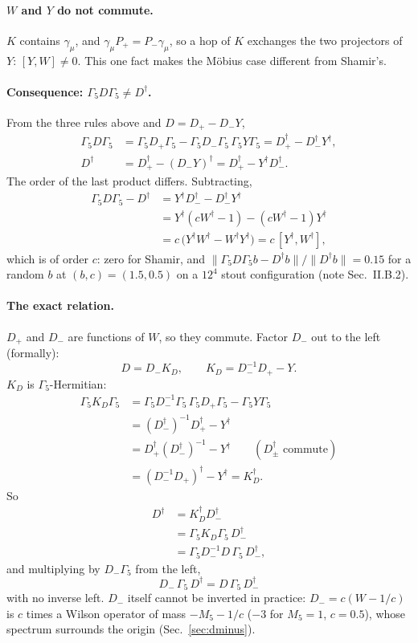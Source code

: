 \documentclass[11pt,a4paper]{article}
\numberwithin{equation}{section}
\newcommand{\dg}{^{\dagger}}
\newcommand{\Pp}{P_{+}}
\newcommand{\Pm}{P_{-}}
\newcommand{\Gfive}{\Gamma_5}
\begin{document}
\paragraph{$W$ and $Y$ do not commute.} $K$ contains $\gamma_\mu$, and
$\gamma_\mu\Pp=\Pm\gamma_\mu$, so a hop of $K$ exchanges the two projectors of $Y$: $[Y,W]\neq0$.
This one fact makes the M\"obius case different from Shamir's.

\paragraph{Consequence: $\Gfive D\Gfive\neq D\dg$.}
From the three rules above and $D=D_+-D_-Y$,
\begin{align}
\Gfive D\Gfive&=\Gfive D_+\Gfive-\Gfive D_-\Gfive\,\Gfive Y\Gfive=D_+\dg-D_-\dg Y\dg,\nonumber\\
D\dg&=D_+\dg-(D_-Y)\dg=D_+\dg-Y\dg D_-\dg .
\end{align}
The order of the last product differs. Subtracting,
\begin{align}
\Gfive D\Gfive-D\dg&=Y\dg D_-\dg-D_-\dg Y\dg\nonumber\\
&=Y\dg(cW\dg-1)-(cW\dg-1)Y\dg\nonumber\\
&=c\,\big(Y\dg W\dg-W\dg Y\dg\big)=c\,[Y\dg,W\dg],
\end{align}
which is of order $c$: zero for Shamir, and $\|\Gfive D\Gfive b-D\dg b\|/\|D\dg b\|=0.15$ for a
random $b$ at $(b,c)=(1.5,0.5)$ on a $12^4$ stout configuration (note Sec.~II.B.2).


\paragraph{The exact relation.}
$D_+$ and $D_-$ are functions of $W$, so they commute. Factor $D_-$ out to the left (formally):
\begin{equation}
D=D_-K_D,\qquad K_D=D_-^{-1}D_+-Y .
\end{equation}
$K_D$ is $\Gfive$-Hermitian:
\begin{align}
\Gfive K_D\Gfive&=\Gfive D_-^{-1}\Gfive\,\Gfive D_+\Gfive-\Gfive Y\Gfive\nonumber\\
&=(D_-\dg)^{-1}D_+\dg-Y\dg\nonumber\\
&=D_+\dg(D_-\dg)^{-1}-Y\dg\qquad(D_\pm\dg\text{ commute})\nonumber\\
&=(D_-^{-1}D_+)\dg-Y\dg=K_D\dg .
\end{align}
So
\begin{align}
D\dg&=K_D\dg D_-\dg\nonumber\\
&=\Gfive K_D\Gfive\,D_-\dg\nonumber\\
&=\Gfive D_-^{-1}D\,\Gfive\,D_-\dg ,
\end{align}
and multiplying by $D_-\Gfive$ from the left,
\begin{equation}
\boxed{\;D_-\,\Gfive\,D\dg=D\,\Gfive\,D_-\dg\;}
\end{equation}
with no inverse left. $D_-$ itself cannot be inverted in practice: $D_-=c(W-1/c)$ is $c$ times a
Wilson operator of mass $-M_5-1/c$ ($-3$ for $M_5=1$, $c=0.5$), whose spectrum surrounds the
origin (Sec.~\ref{sec:dminus}).
\end{document}
